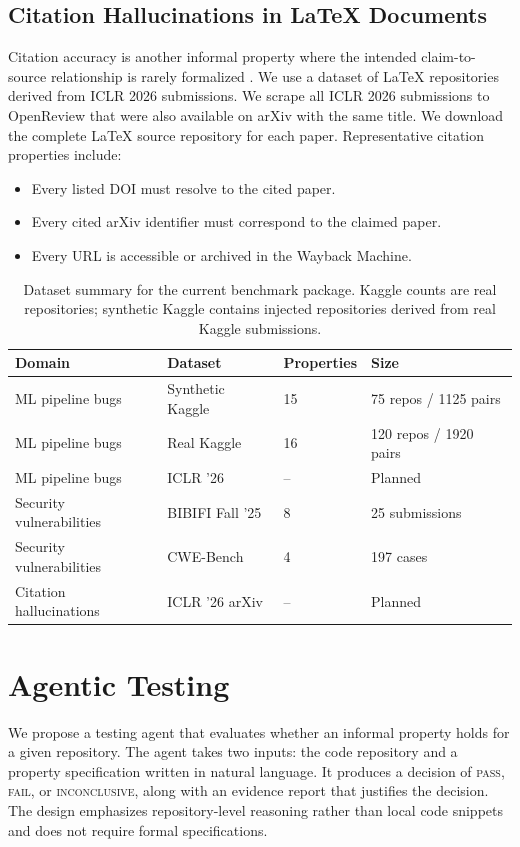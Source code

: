 \documentclass{article}
\theoremstyle{plain}
\theoremstyle{definition}
\theoremstyle{remark}
\begin{document}
\subsection{Citation Hallucinations in \LaTeX{} Documents}
Citation accuracy is another informal property where the intended claim-to-source relationship is rarely formalized \citep{ye2023agree,haan2025semanticcite}.
We use a dataset of \LaTeX{} repositories derived from ICLR 2026 submissions.
We scrape all ICLR 2026 submissions to OpenReview that were also available on arXiv with the same title.
We download the complete \LaTeX{} source repository for each paper.
Representative citation properties include:
\begin{itemize}
  \item Every listed DOI must resolve to the cited paper.
  \item Every cited arXiv identifier must correspond to the claimed paper.
  \item Every URL is accessible or archived in the Wayback Machine.
\end{itemize}

\begin{table}[t]
  \centering
  \caption{Dataset summary for the current benchmark package. Kaggle counts are real repositories; synthetic Kaggle contains injected repositories derived from real Kaggle submissions.}
  \label{tab:datasets}
  \begin{tabular}{llll}
    \toprule
    Domain & Dataset & Properties & Size \\
    \midrule
    ML pipeline bugs & Synthetic Kaggle & 15 & 75 repos / 1125 pairs \\
    ML pipeline bugs & Real Kaggle & 16 & 120 repos / 1920 pairs \\
    ML pipeline bugs & ICLR '26 & -- & Planned \\
    Security vulnerabilities & BIBIFI Fall '25 & 8 & 25 submissions \\
    Security vulnerabilities & CWE-Bench & 4 & 197 cases \\
    Citation hallucinations & ICLR '26 arXiv & -- & Planned \\
    \bottomrule
  \end{tabular}
\end{table}

\section{Agentic Testing}
We propose a testing agent that evaluates whether an informal property holds for a given repository.
The agent takes two inputs: the code repository and a property specification written in natural language.
It produces a decision of \textsc{pass}, \textsc{fail}, or \textsc{inconclusive}, along with an evidence report that justifies the decision.
The design emphasizes repository-level reasoning rather than local code snippets and does not require formal specifications.
\end{document}
